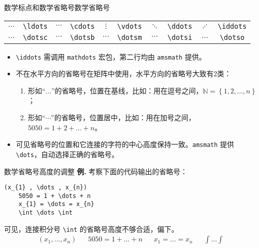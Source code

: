 \documentclass[mathserif]{beamer}
\newcommand{\codegreen}[1]{\textcolor{codegreen}{#1}}
\newcommand{\natura}{\mathbb N}
\newenvironment{instance}{\zihao{-5}\textbf{\songti \codegreen{例.}}}{\hfill\par}
\begin{document}
\begin{frame}[fragile]{数学标点和数学省略号}{数学省略号}
\begin{table}[H]
\centering
\begin{tabular}{cc|cc|cc|cc|cc}
	\toprule
	$\ldots$ & \lstinline'\ldots' & $\cdots$ & \lstinline'\cdots' & $\vdots$ & \lstinline'\vdots' & $\ddots$ & \lstinline'\ddots' & $\iddots$ & \lstinline'\iddots' \\
	$\dotsc$ & \lstinline'\dotsc' & $\dotsb$ & \lstinline'\dotsb' & $\dotsm$ & \lstinline'\dotsm' & $\dotsi$ & \lstinline'\dotsi' & $\dotso$ & \lstinline'\dotso' \\
	\bottomrule
\end{tabular}
\end{table}
\begin{itemize}

\item \lstinline'\iddots' 需调用 \verb'mathdots' 宏包，第二行均由 \verb'amsmath' 提供。

\item 不在水平方向的省略号在矩阵中使用，水平方向的省略号大致有2类：
\begin{enumerate}[(1)]

\item 形如``$\ldots$''的省略号，位置在基线，比如：用在逗号之间，$\natura = \left\{ 1, 2, \ldots, n \right\}$；

\item 形如``$\cdots$''的省略号，位置居中，比如：用在加号之间，$5050 = 1 + 2 +\dots+ n$。

\end{enumerate}

\item 可见省略号的位置和它连接的字符的中心高度保持一致。\verb'amsmath' 提供 \lstinline'\dots'，自动选择正确的省略号。

\end{itemize}
\end{frame}

\begin{frame}[fragile]{数学省略号}{高度的调整}
\begin{instance}
	考察下面的代码输出的省略号：
\begin{lstlisting}[numbers=none]
	(x_{1} , \dots , x_{n})
	5050 = 1 + \dots + n
	x_{1} = \dots = x_{n}
	\int \dots \int
\end{lstlisting}
可见，连接积分号 \lstinline'\int' 的省略号高度不够合适，偏下。
\begin{align*}
	(x_{1} , \dots , x_{n}) &&
	5050 = 1 + \dots + n &&
	x_{1} = \dots = x_{n} &&
	\int \dots \int
\end{align*}
\end{instance}
\end{frame}
\end{document}
